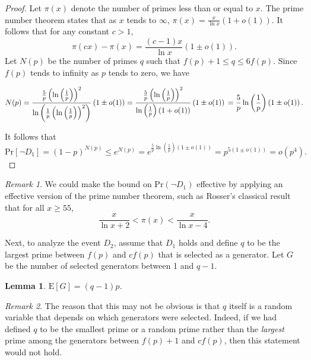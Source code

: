 \documentclass[11pt]{amsart}
\newtheorem{lemma}[theorem]{Lemma}
\theoremstyle{definition}
\theoremstyle{remark}
\newtheorem*{rem}{Remark}
\def\Pr{\ensuremath{\mathrm{Pr}}}
\def\EE{\ensuremath{\mathrm{E}}}
\begin{document}
\begin{proof}
  Let $\pi(x)$ denote the number of primes less than or equal to $x$. The prime number theorem states that as $x$ tends to $\infty$, $\pi(x) = \frac{x}{\ln x} \left( 1 + o(1) \right)$. It follows that for any constant $c > 1$,
  \[ \pi(cx) - \pi(x) = \frac{(c-1)x}{\ln x} \left( 1 \pm o(1) \right). \]
  Let $N(p)$ be the number of primes $q$ such that $f(p)+1 \leq q \leq 6f(p)$. Since $f(p)$ tends to infinity as $p$ tends to zero, we have  

\[ N(p) = \frac{\frac{5}{p} \left( \ln \left( \frac{1}{p} \right) \right)^2}
    {\ln \left( \frac{1}{p} \left( \ln \left( \frac{1}{p} \right) \right)^2 \right)}
    \left( 1 \pm o(1) \right) = \frac{\frac{5}{p} \left( \ln \left( \frac{1}{p} \right) \right)^2}
         {\ln \left( \frac{1}{p} \right) \left( 1 + o(1) \right)}
         \left( 1 \pm o(1) \right) \\
        = \frac{5}{p} \ln \left( \frac{1}{p} \right) \left( 1 \pm o(1) \right).\]

  It follows that
  \[ \Pr\left[ \lnot D_1 \right] = (1-p)^{N(p)} \leq e^{N(p)} = e^{\frac{5}{p} \ln \left( \frac{1}{p} \right) \left( 1 \pm o(1) \right)} 
    = p^{5 \left( 1 \pm o(1) \right)}  = o\left(p^4\right).\]
\end{proof}

\begin{rem}
  We could make the bound on $\Pr(\lnot D_1)$ effective by applying an effective version of the prime number theorem, such as Rosser's classical result \cite{rosser1941} that for all $x \geq 55$,
  \[ \frac{x}{\ln x + 2} < \pi(x) < \frac{x}{\ln x - 4}.\]
\end{rem}
\quad

Next, to analyze the event $D_2$, assume that $D_1$ holds and define $q$ to be the largest prime between $f(p)$ and $cf(p)$ that is selected as a generator. Let $G$ be the number of selected generators between 1 and $q-1$. 

\begin{lemma} \label{lem:expectedG}
$\EE[G] = (q-1)p$. 
\end{lemma}

\begin{rem}
The reason that this may not be obvious is that $q$ itself is a random variable that depends on which generators were selected. Indeed, if we had defined $q$ to be the smallest prime or a random prime rather than the \emph{largest} prime among the generators between $f(p)+1$ and $cf(p)$, then this statement would not hold.     
\end{rem}
\end{document}
